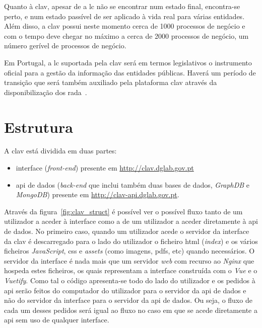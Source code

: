 Quanto à \acrshort{clav}, apesar de a \acrshort{lc} não se encontrar num estado final, encontra-se perto, e num estado passível de ser aplicado à vida real para várias entidades. Além disso, a \acrshort{clav} possui neste momento cerca de 1000 processos de negócio e com o tempo deve chegar no máximo a cerca de 2000 processos de negócio, um número gerível de processos de negócio.

Em Portugal, a \acrshort{lc} suportada pela \acrshort{clav} será em termos legislativos o instrumento oficial para a gestão da informação das entidades públicas. Haverá um período de transição que será também auxiliado pela plataforma \acrshort{clav} através da disponibilização dos \acrshort{rada}~\cite{rada}.

\section{Estrutura}
A \acrshort{clav} está dividida em duas partes:
\begin{itemize}
    \item interface (\textit{front-end}) presente em \url{http://clav.dglab.gov.pt}
    \item \acrshort{api} de dados (\textit{back-end} que inclui também duas bases de dados, \textit{GraphDB} e \textit{MongoDB}) presente em \url{http://clav-api.dglab.gov.pt}.
\end{itemize}

Através da figura~\ref{fig:clav_struct} é possível ver o possível fluxo tanto de um utilizador a aceder à interface como a de um utilizador a aceder diretamente à \acrshort{api} de dados. No primeiro caso, quando um utilizador acede o servidor da interface da \acrshort{clav} é descarregado para o lado do utilizador o ficheiro \acrshort{html} (\textit{index}) e os vários ficheiros \textit{JavaScript}, \acrshort{css} e \textit{assets} (como imagens, \acrshort{pdf}s, etc) quando necessários. O servidor da interface é nada mais que um servidor \textit{web} com recurso ao \textit{Nginx} que hospeda estes ficheiros, os quais representam a interface construída com o \textit{Vue} e o \textit{Vuetify}. Como tal o código apresenta-se todo do lado do utilizador e os pedidos à \acrshort{api} serão feitos do computador do utilizador para o servidor da \acrshort{api} de dados e não do servidor da interface para o servidor da \acrshort{api} de dados. Ou seja, o fluxo de cada um desses pedidos será igual ao fluxo no caso em que se acede diretamente a \acrshort{api} sem uso de qualquer interface.

